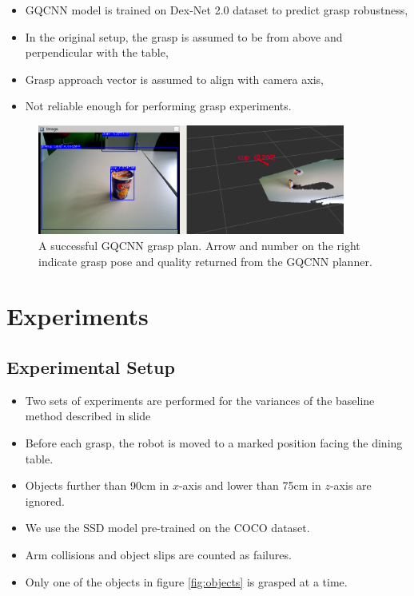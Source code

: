 \documentclass[runningheads]{../llncs}
\begin{document}
\begin{itemize}
    \item GQCNN model \cite{mahler2017} is trained on Dex-Net 2.0 dataset to predict grasp robustness,
    \item In the original setup, the grasp is assumed to be from above and perpendicular with the table,
    \item Grasp approach vector is assumed to align with camera axis,
    \item Not reliable enough for performing grasp experiments.
\end{itemize}

\begin{figure}[h!]
    \centering
    \includegraphics[width=0.9\textwidth]{grasp_gqcnn_result}
    \caption{A successful GQCNN grasp plan. Arrow and number on the right indicate grasp pose and quality returned from
             the GQCNN planner.}
    \label{fig:gqcnn_result}
\end{figure}

\section{Experiments} \label{section:experiments}

\subsection{Experimental Setup}

\begin{itemize}
    \item Two sets of experiments are performed for the variances of the baseline method described in slide
    \item Before each grasp, the robot is moved to a marked position facing the dining table.
    \item Objects further than 90cm in $ x $-axis and lower than 75cm in $ z $-axis are ignored.
    \item We use the SSD model pre-trained on the COCO dataset.
    \item Arm collisions and object slips are counted as failures.
    \item Only one of the objects in figure \ref{fig:objects} is grasped at a time.
\end{itemize}
\end{document}
